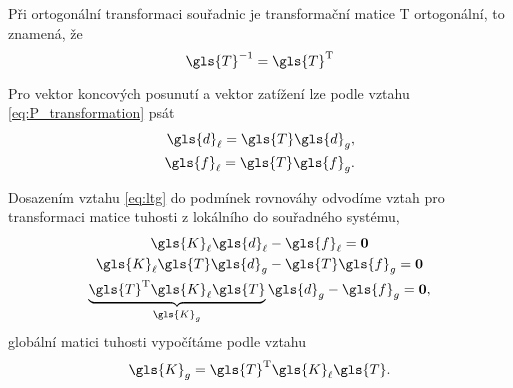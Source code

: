 Při ortogonální transformaci souřadnic je transformační matice \gls{T} ortogonální, to znamená, že
\begin{equation}
    \gls{T}^{-1} = \gls{T}^{\mathrm{T}}
\end{equation}

Pro vektor koncových posunutí a vektor zatížení lze podle vztahu \ref{eq:P_transformation} psát
\begin{equation} \label{eq:ltg}
    \begin{aligned}
        \gls{d}_{\ell} = \gls{T} \gls{d}_{g}, \\
        \gls{f}_{\ell} = \gls{T} \gls{f}_{g}.
    \end{aligned}
\end{equation}

Dosazením vztahu \ref{eq:ltg} do podmínek rovnováhy odvodíme vztah pro transformaci matice tuhosti z lokálního do souřadného systému,
\begin{equation}
    \begin{gathered}
        \gls{K}_{\ell} \gls{d}_{\ell} - \gls{f}_{\ell} = \matr{0} \\
        \gls{K}_{\ell} \gls{T} \gls{d}_{g} - \gls{T} \gls{f}_{g} = \matr{0} \\
        \underbrace{\gls{T}^\mathrm{T} \gls{K}_{\ell} \gls{T}}_{\gls{K}_g} \gls{d}_{g} - \gls{f}_{g} = \matr{0},
    \end{gathered}
\end{equation}
globální matici tuhosti vypočítáme podle vztahu
\begin{equation}
    \gls{K}_g = \gls{T}^\mathrm{T} \gls{K}_{\ell} \gls{T}.
\end{equation}